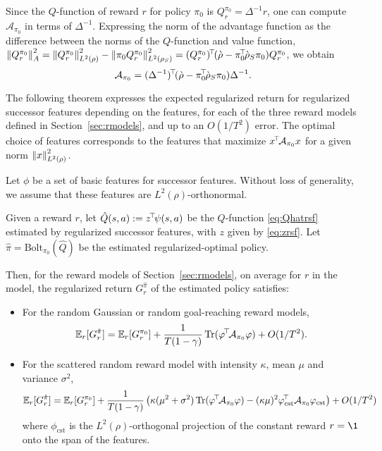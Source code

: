 \documentclass[11pt,a4paper]{article}
\newcommand{\Bol}{\mathrm{Bolt}_{\pi_0}}
\newcommand{\AK}{\mathcal{A}}
\newcommand{\drho}{\grave \rho}
\newcommand{\option}[1]{{\color[rgb]{.4,0,.8}[Optional:#1]}} %
\renewcommand{\option}[1]{}  %
\begin{document}
Since the $Q$-function of reward $r$ for policy $\pi_0$ is
$Q^{\pi_0}_r=\Delta^{-1}r$, one can compute $\AK_{\pi_0}$ 
in terms of $\Delta^{-1}$. Expressing the norm of the
advantage function as the difference between the norms of the
$Q$-function and value function, 
$\norm{Q^{\pi_0}_r}^2_A=\norm{Q^{\pi_0}_r}^2_{L^2(\rho)}-\norm{\pi_0
Q^{\pi_0}_r}^2_{L^2(\rho_S)}=\transp{(Q^{\pi_0}_r)}(\drho-\transp{\pi_0}\drho_S\pi_0)Q^{\pi_0}_r$,
we obtain
\begin{equation}
\AK_{\pi_0}=\transp{(\Delta^{-1})} (\drho
-\transp{\pi_0}\drho_S\pi_0)\Delta^{-1}.
\end{equation}

\option{ should we use $\langle r, \AK_\pi r\rangle_{L^2(\rho)}$
everywhere
instead?}

\bigskip

The following theorem expresses the expected regularized return for
regularized successor features depending on the features, for each of the
three reward models defined in Section~\ref{sec:rmodels}, and up to an
$O(1/T^2)$ error. The optimal
choice of features corresponds to the features that maximize
$\transp{x}\AK_{\pi_0}x$ for a given norm $\left\lVert x\right\rVert^2_{L^2(\rho)}$.

\begin{thm}
\label{thm:featurereturn}
Let $\phi$ be a set of basic features for successor features. Without
loss of generality, we
assume that these features are $L^2(\rho)$-orthonormal.

Given a reward $r$, let $\hat Q(s,a)\mathrel{\mathop{:}}= z^{\!\top}\!\psi(s,a)$ be the
$Q$-function \eqref{eq:Qhatrsf} estimated by regularized successor features, with $z$ given
by \eqref{eq:zrsf}. Let $\hat \pi=\Bol(\hat Q)$ be the estimated
regularized-optimal policy.

Then, for the reward models of Section~\ref{sec:rmodels}, on
average for $r$ in the model,
the regularized return $G^{\hat \pi}_r$ of the estimated policy
satisfies:
\begin{itemize}
\item
For the random Gaussian or random goal-reaching reward models,
\begin{equation}
\E_r [G^{\hat \pi}_r]=\E_r [G^{\pi_0}_r] + \frac{1}{T(1-\gamma)}
\Tr(\transp{\phi}\AK_{\pi_0}\phi) + O(1/T^2).
\end{equation}
\item
For the scattered random reward model with intensity $\kappa$, mean $\mu$
and variance $\sigma^2$,
\begin{equation}
\label{eq:scatteredgain}
\E_r [G^{\hat \pi}_r]=\E_r [G^{\pi_0}_r] +
\frac{1}{T(1-\gamma)}\left(
\kappa (\mu^2+\sigma^2)\Tr(\transp{\phi}\AK_{\pi_0}\phi)
-(\kappa\mu)^2 \transp{\phi_\mathrm{cst}}\,\AK_{\pi_0}\phi_\mathrm{cst}
\right)
+ O(1/T^2)
\end{equation}
where $\phi_\mathrm{cst}$ is the $L^2(\rho)$-orthogonal projection of the
constant reward $r=\1$ onto the span of the features.

\end{itemize}
\end{thm}
\end{document}
